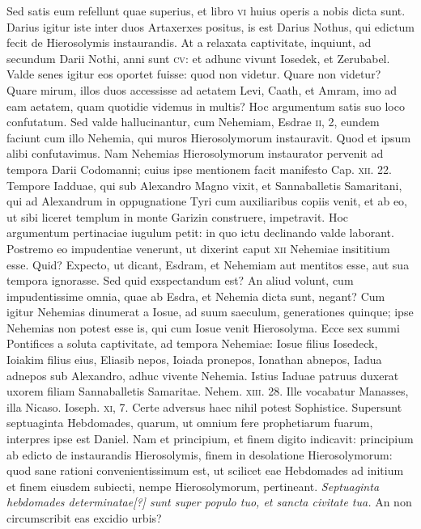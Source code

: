 Sed satis eum refellunt quae superius, et libro
\textsc{vi} huius operis a nobis dicta sunt.
Darius igitur iste inter duos Artaxerxes
positus, is est Darius Nothus, qui edictum fecit de Hierosolymis
instaurandis.
At a relaxata captivitate, inquiunt, ad secundum
Darii Nothi, anni sunt \textsc{cv}: et adhunc vivunt Iosedek, et Zerubabel.
Valde senes igitur eos oportet fuisse: quod non videtur.
Quare non videtur?
Quare mirum, illos duos accessisse ad aetatem
Levi, Caath, et Amram, imo ad eam aetatem, quam quotidie videmus
in multis?
Hoc argumentum satis suo loco confutatum.
Sed
valde hallucinantur, cum Nehemiam, Esdrae \textsc{ii}, 2, eundem faciunt
cum illo Nehemia, qui muros Hierosolymorum instauravit.
Quod et ipsum alibi confutavimus.
Nam Nehemias Hierosolymorum
instaurator pervenit ad tempora Darii Codomanni;
cuius ipse mentionem facit manifesto Cap. \textsc{xii}. 22.
Tempore Iadduae,
qui sub Alexandro Magno vixit, et Sannaballetis Samaritani,
qui ad Alexandrum in oppugnatione Tyri cum auxiliaribus
copiis venit, et ab eo, ut sibi liceret templum in monte Garizin
construere, impetravit.
Hoc argumentum pertinaciae iugulum
petit: in quo ictu declinando valde laborant.
Postremo
eo impudentiae venerunt, ut dixerint caput \textsc{xii} Nehemiae insititium
esse.
Quid?
Expecto, ut dicant, Esdram, et Nehemiam aut
mentitos esse, aut sua tempora ignorasse.
Sed quid exspectandum
est?
An aliud volunt, cum impudentissime omnia, quae ab Esdra,
et Nehemia dicta sunt, negant?
Cum igitur Nehemias dinumerat
a Iosue, ad suum saeculum, generationes quinque; ipse
Nehemias non potest esse is, qui cum Iosue venit Hierosolyma.
Ecce sex summi Pontifices a soluta captivitate, ad tempora Nehemiae:
Iosue filius Iosedeck, Ioiakim filius eius, Eliasib nepos,
Ioiada pronepos, Ionathan abnepos, Iadua adnepos sub Alexandro,
adhuc vivente Nehemia.
Istius Iaduae patruus duxerat uxorem
filiam Sannaballetis Samaritae.
Nehem. \textsc{xiii}. 28.
Ille vocabatur
Manasses, illa Nicaso.
Ioseph. \textsc{xi}, 7.
Certe adversus haec
nihil potest Sophistice.
Supersunt septuaginta Hebdomades, quarum,
ut omnium fere prophetiarum fuarum, interpres ipse est Daniel.
Nam et principium, et finem digito indicavit: principium ab
edicto de instaurandis Hierosolymis, finem in desolatione Hierosolymorum:
quod sane rationi convenientissimum est, ut scilicet eae
Hebdomades ad initium et finem eiusdem subiecti, nempe Hierosolymorum,
pertineant.
\textit{Septuaginta hebdomades determinatae[?] sunt
super populo tuo, et sancta civitate tua.}
{}
An non circumscribit eas
excidio urbis?

